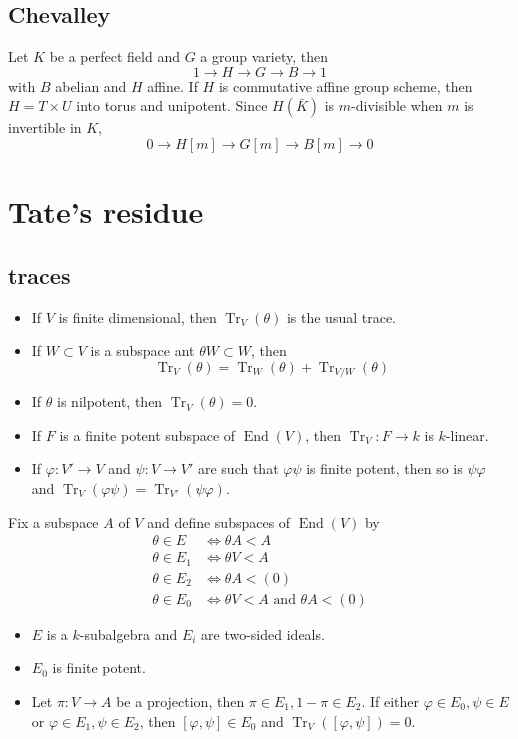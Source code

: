 \documentclass[leqno]{amsart}
\DeclareMathOperator{\mtr}{Tr}
\newcommand{\1}{\mathbf{1}}
\DeclareMathOperator{\End}{End}
\theoremstyle{definition}
\theoremstyle{remark}
\begin{document}
\subsection{Chevalley}

Let $K$ be a perfect field
and  $G$ a group variety,
then 
 \[
	1\to H\to G\to B\to1
\]
with $B$ abelian and  $H$ affine.
If  $H$ is commutative affine group scheme,
then  $H=T\times U$
into torus and unipotent.
Since  $H(\bar{K})$ is $m$-divisible
when  $m$ is invertible in  $K$,
 \[
	 0\to H[m]\to G[m]\to B[m]\to 0
\]

\section{Tate's residue}

\subsection{traces}
\begin{itemize}
	\item If $V$ is finite dimensional,
		then  $\mtr_V(\theta)$
		is the usual trace.
	\item If  $W\subset V$ is a subspace
		ant  $\theta W\subset W$, then
		 \[
			 \mtr_V(\theta)=
			 \mtr_W(\theta)+
			 \mtr_{V/W}(\theta)
		\]
	\item If $\theta$ is nilpotent, then
		$\mtr_V(\theta)=0$.
	\item If  $F$ is a finite potent subspace of  $\End(V)$,
		then  $\mtr_V\colon F\to k$ is  $k$-linear.
	\item If  $\varphi\colon V'\to V$ and $\psi\colon V\to V'$
		are such that $\varphi\psi$
		is finite potent, then so is  $\psi\varphi$
		and  $\mtr_V(\varphi\psi)=\mtr_{V'}(\psi\varphi)$.
\end{itemize}

Fix a subspace $A$ of  $V$
and define subspaces of $\End(V)$ by
\begin{align*}
	\theta\in E&\Longleftrightarrow \theta A<A\\
	\theta\in E_1&\Longleftrightarrow \theta V<A\\
	\theta\in E_2&\Longleftrightarrow \theta A<(0)\\
	\theta\in E_0&\Longleftrightarrow \theta V<A\text{ and }\theta A<(0)
\end{align*}
\begin{itemize}
	\item $E$ is a  $k$-subalgebra
		and  $E_i$ are two-sided ideals.
	\item $E_0$ is finite potent.
	\item Let $\pi\colon V\to A$ be a projection,
	then  $\pi\in E_1, 1-\pi\in E_2$.
	If either $\varphi\in E_0, \psi\in E$ or
	$\varphi\in E_1, \psi\in E_2$,
	then  $[\varphi,\psi]\in E_0$
	and  $\mtr_V([\varphi,\psi])=0$.
\end{itemize}
\end{document}

